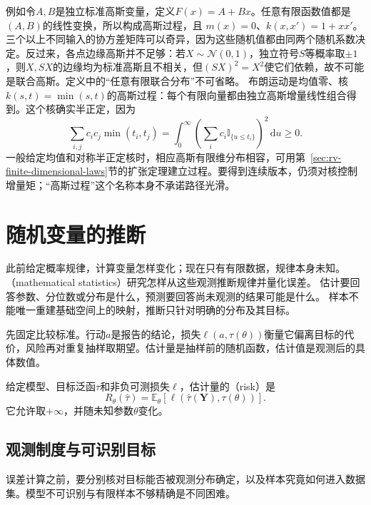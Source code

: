 例如令\(A,B\)是独立标准高斯变量，定义\(F(x)=A+Bx\)。任意有限函数值都是\((A,B)\)的线性变换，所以构成高斯过程，且
\(m(x)=0\)、\(k(x,x')=1+xx'\)。三个以上不同输入的协方差矩阵可以奇异，因为这些随机值都由同两个随机系数决定。反过来，各点边缘高斯并不足够：若\(X\sim\mathcal N(0,1)\)，独立符号\(S\)等概率取\(\pm1\)，则\(X,SX\)的边缘均为标准高斯且不相关，但\((SX)^2=X^2\)使它们依赖，故不可能是联合高斯。定义中的“任意有限联合分布”不可省略。
布朗运动是均值零、核\(k(s,t)=\min(s,t)\)的高斯过程：每个有限向量都由独立高斯增量线性组合得到。这个核确实半正定，因为
\[
\sum_{i,j}c_ic_j\min(t_i,t_j)
=\int_0^\infty\left(\sum_i c_i\mathbb I_{\{u\leq t_i\}}\right)^2\,\mathrm du\geq0.
\]
一般给定均值和对称半正定核时，相应高斯有限维分布相容，可用第~\ref{sec:rv-finite-dimensional-laws}节的扩张定理建立过程。要得到连续版本，仍须对核控制增量矩；“高斯过程”这个名称本身不承诺路径光滑。

\section{随机变量的推断}
\label{sec:rv-inference}
此前给定概率规律，计算变量怎样变化；现在只有有限数据，规律本身未知。
（mathematical statistics）研究怎样从这些观测推断规律并量化误差。
估计要回答参数、分位数或分布是什么，预测要回答尚未观测的结果可能是什么。
样本不能唯一重建基础空间上的映射，推断只针对明确的分布及其目标。

先固定比较标准。行动\(a\)是报告的结论，损失\(\ell(a,\tau(\theta))\)衡量它偏离目标的代价，风险再对重复抽样取期望。估计量是抽样前的随机函数，估计值是观测后的具体数值。
\begin{definition}[估计量的风险]
  \label{def:statistics-estimator-risk}
给定模型、目标泛函\(\tau\)和非负可测损失\(\ell\)，估计量的（risk）是
\[
  R_\theta(\widehat\tau)
  =\mathbb{E}_\theta[
    \ell(\widehat\tau(\bm Y),\tau(\theta))].
\]
它允许取\(+\infty\)，并随未知参数\(\theta\)变化。
\end{definition}

\subsection{观测制度与可识别目标}
\label{sec:stats-targets-data-sources}
误差计算之前，要分别核对目标能否被观测分布确定，以及样本究竟如何进入数据集。模型不可识别与有限样本不够精确是不同困难。

